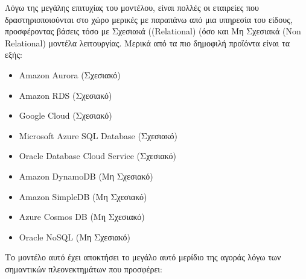 \documentclass{article}
\begin{document}
Λόγω της μεγάλης επιτυχίας του μοντέλου, είναι πολλές οι εταιρείες που δραστηριοποιούνται στο χώρο μερικές με παραπάνω από μια υπηρεσία του είδους, προσφέροντας βάσεις τόσο με Σχεσιακά ((Relational) (όσο και Μη Σχεσιακά (Non Relational) μοντέλα λειτουργίας. Μερικά από τα πιο δημοφιλή προϊόντα είναι τα εξής:
\begin{itemize}
\item Amazon Aurora (Σχεσιακό)
\item Amazon RDS (Σχεσιακό)
\item Google Cloud (Σχεσιακό)
\item Microsoft Azure SQL Database (Σχεσιακό)
\item Oracle Database Cloud Service (Σχεσιακό)
\item Amazon DynamoDB (Μη Σχεσιακό)
\item Amazon SimpleDB (Μη Σχεσιακό)
\item Azure Cosmos DB (Μη Σχεσιακό)
\item Oracle NoSQL (Μη Σχεσιακό)
\end{itemize}
Το μοντέλο αυτό έχει αποκτήσει το μεγάλο αυτό μερίδιο της αγοράς λόγω των σημαντικών πλεονεκτημάτων που προσφέρει:
\end{document}
